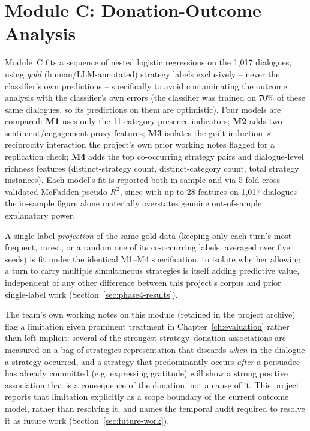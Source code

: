 \section{Module C: Donation-Outcome Analysis}
\label{sec:design-module-c}

Module~C fits a sequence of nested logistic regressions on the 1{,}017
dialogues, using \emph{gold} (human/LLM-annotated) strategy labels
exclusively -- never the classifier's own predictions -- specifically to
avoid contaminating the outcome analysis with the classifier's own errors
(the classifier was trained on 70\% of these same dialogues, so its
predictions on them are optimistic). Four models are compared: \textbf{M1}
uses only the 11 category-presence indicators; \textbf{M2} adds two
sentiment/engagement proxy features; \textbf{M3} isolates the
guilt-induction $\times$ reciprocity interaction the project's own prior
working notes flagged for a replication check; \textbf{M4} adds the top
co-occurring strategy pairs and dialogue-level richness features
(distinct-strategy count, distinct-category count, total strategy
instances). Each model's fit is reported both in-sample and via 5-fold
cross-validated McFadden pseudo-$R^2$, since with up to 28 features on 1{,}017
dialogues the in-sample figure alone materially overstates genuine
out-of-sample explanatory power.

A single-label \emph{projection} of the same gold data (keeping only each
turn's most-frequent, rarest, or a random one of its co-occurring labels,
averaged over five seeds) is fit under the identical M1--M4 specification, to
isolate whether allowing a turn to carry multiple simultaneous strategies is
itself adding predictive value, independent of any other difference between
this project's corpus and prior single-label work (Section~\ref{sec:phase4-results}).

The team's own working notes on this module (retained in the project archive)
flag a limitation given prominent treatment in Chapter~\ref{ch:evaluation}
rather than left implicit: several of the strongest strategy--donation
associations are measured on a bag-of-strategies representation that discards
\emph{when} in the dialogue a strategy occurred, and a strategy that
predominantly occurs \emph{after} a persuadee has already committed (e.g.
expressing gratitude) will show a strong positive association that is a
consequence of the donation, not a cause of it. This project reports that
limitation explicitly as a scope boundary of the current outcome model,
rather than resolving it, and names the temporal audit required to resolve
it as future work (Section~\ref{sec:future-work}).

